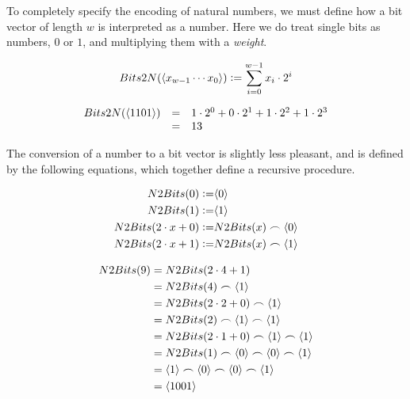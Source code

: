To completely specify the encoding of natural numbers, we must define
how a bit vector of length $w$ is interpreted as a number.  Here we do
treat single bits as numbers, $0$ or $1$, and multiplying them with a
\emph{weight}.

\begin{definition}
\begin{align*}
    Bits2N(\langle x_{w-1}\cdots x_{0} \rangle) \vcentcolon= \sum_{i=0}^{w-1} x_{i} \cdot{} 2^{i}
\end{align*}
\label{def:bits2n}
\end{definition}

\begin{example}
  \[
    \begin{array}{rcl}
      Bits2N(\langle 1101 \rangle) & = & 1 \cdot 2^{0} + 0 \cdot 2^{1} + 1 \cdot 2^{2} + 1 \cdot 2^{3} \\
                               & = & 13
    \end{array}
  \]
\end{example}

The conversion of a number to a bit vector is slightly less pleasant,
and is defined by the following equations, which together define a
recursive procedure.

\begin{definition}
  \begin{align}
    N2Bits(0) \vcentcolon= & \langle 0 \rangle \\
    N2Bits(1) \vcentcolon= & \langle 1 \rangle \\
    N2Bits(2\cdot{}x + 0) \vcentcolon= & N2Bits(x)\frown\langle 0 \rangle \\
    N2Bits(2\cdot{}x + 1) \vcentcolon= & N2Bits(x)\frown\langle 1 \rangle
  \end{align}
\end{definition}

  \begin{example}
\begin{align*}
  N2Bits(9) &= N2Bits(2\cdot{}4 + 1) \\
            &= N2Bits(4) \frown \langle 1 \rangle \\
            &= N2Bits(2\cdot{}2 + 0) \frown \langle 1 \rangle \\
            &= N2Bits(2) \frown \langle 1 \rangle \frown \langle 1 \rangle \\
            &= N2Bits(2\cdot{}1 + 0) \frown \langle 1 \rangle \frown \langle 1 \rangle \\
            &= N2Bits(1) \frown \langle 0 \rangle \frown \langle 0 \rangle \frown \langle 1 \rangle \\
            &= \langle 1 \rangle \frown \langle 0 \rangle \frown \langle 0 \rangle \frown \langle 1 \rangle \\
            &= \langle 1001 \rangle
\end{align*}
  \end{example}


